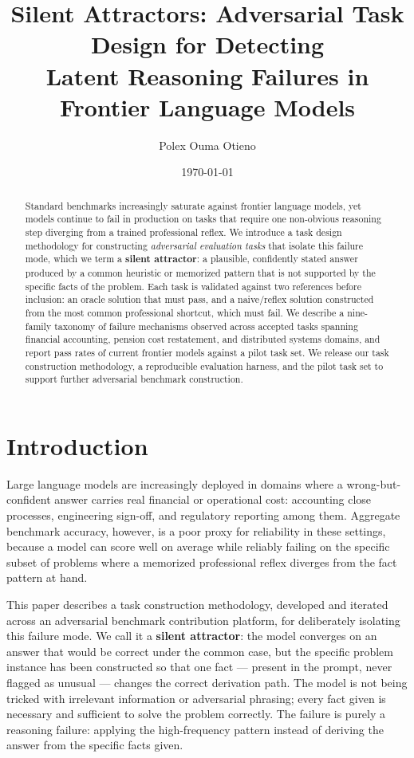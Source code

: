 \documentclass[11pt]{article}
\title{Silent Attractors: Adversarial Task Design for Detecting\\
Latent Reasoning Failures in Frontier Language Models}
\author[1]{Polex Ouma Otieno}
\affil[1]{Independent Researcher / Smartlinks Ltd}
\date{\today}
\begin{document}
\maketitle

\begin{abstract}
Standard benchmarks increasingly saturate against frontier language
models, yet models continue to fail in production on tasks that require
one non-obvious reasoning step diverging from a trained professional
reflex. We introduce a task design methodology for constructing
\emph{adversarial evaluation tasks} that isolate this failure mode,
which we term a \textbf{silent attractor}: a plausible, confidently
stated answer produced by a common heuristic or memorized pattern that
is not supported by the specific facts of the problem. Each task is
validated against two references before inclusion: an oracle solution
that must pass, and a naive/reflex solution constructed from the most
common professional shortcut, which must fail. We describe a nine-family
taxonomy of failure mechanisms observed across accepted tasks spanning
financial accounting, pension cost restatement, and distributed systems
domains, and report pass rates of current frontier models against a
pilot task set. We release our task construction methodology, a
reproducible evaluation harness, and the pilot task set to support
further adversarial benchmark construction.
\end{abstract}

\section{Introduction}

Large language models are increasingly deployed in domains where a
wrong-but-confident answer carries real financial or operational cost:
accounting close processes, engineering sign-off, and regulatory
reporting among them. Aggregate benchmark accuracy, however, is a poor
proxy for reliability in these settings, because a model can score well
on average while reliably failing on the specific subset of problems
where a memorized professional reflex diverges from the fact pattern at
hand.

This paper describes a task construction methodology, developed and
iterated across an adversarial benchmark contribution platform, for
deliberately isolating this failure mode. We call it a \textbf{silent
attractor}: the model converges on an answer that would be correct
under the common case, but the specific problem instance has been
constructed so that one fact --- present in the prompt, never
flagged as unusual --- changes the correct derivation path. The model
is not being tricked with irrelevant information or adversarial
phrasing; every fact given is necessary and sufficient to solve the
problem correctly. The failure is purely a reasoning failure: applying
the high-frequency pattern instead of deriving the answer from the
specific facts given.
\end{document}
